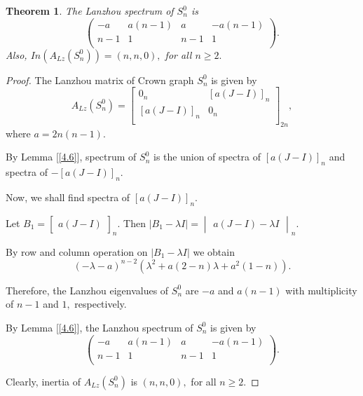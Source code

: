\documentclass[10pt,a4paper,oneside]{article}
\newtheorem{theorem}{Theorem}
\begin{document}
\begin{theorem}
	The Lanzhou spectrum of $S_n^0$ is $$\begin{pmatrix}
		-a & a(n-1) & a & -a(n-1)\\
		n-1 & 1 & n-1 & 1\\
	\end{pmatrix}.$$ Also, $In(A_{Lz}(S_n^0))= (n,n,0),$ for all $n\geq 2.$
\end{theorem}
\begin{proof}
	The Lanzhou matrix of Crown graph $S_n^0$ is given by
	$$A_{Lz}(S_n^0)=\begin{bmatrix}
		0_n & [a(J-I)]_n\\
		[a(J-I)]_n & 0_n\\
	\end{bmatrix}_{2n},$$ where $a=2n(n-1).$
	
	By Lemma [\ref{4.6}], spectrum of $S_n^0$ is the union of spectra of $[a(J-I)]_n$ and spectra of $-[a(J-I)]_n.$ 
	
	
	Now, we shall find spectra of $[a(J-I)]_n.$
	
	
	Let $B_1=\begin{bmatrix}
		a(J-I)
	\end{bmatrix}_{n}.$ Then $\vert B_1-\lambda I\vert =\begin{vmatrix}
		a(J-I)-\lambda I
	\end{vmatrix}_{n}.$
	
	
	By row and column operation on $\vert B_1-\lambda I \vert $ we obtain $$(-\lambda-a)^{n-2}(\lambda^2+a(2-n)\lambda+a^2(1-n)).$$
	
	
	Therefore, the Lanzhou eigenvalues of $S_n^0$ are $-a $ and $a(n-1)$ with multiplicity of $n-1$ and $1,$ respectively.
	
	
	By Lemma [\ref{4.6}], the Lanzhou spectrum of $S_n^0$ is given by $$\begin{pmatrix}
	-a & a(n-1) & a & -a(n-1)\\
	n-1 & 1 & n-1 & 1\\
	\end{pmatrix}.$$
	
	
	Clearly, inertia of $A_{Lz}(S_n^0)$ is $(n,n,0),$ for all $n\geq 2.$
\end{proof}
\end{document}
